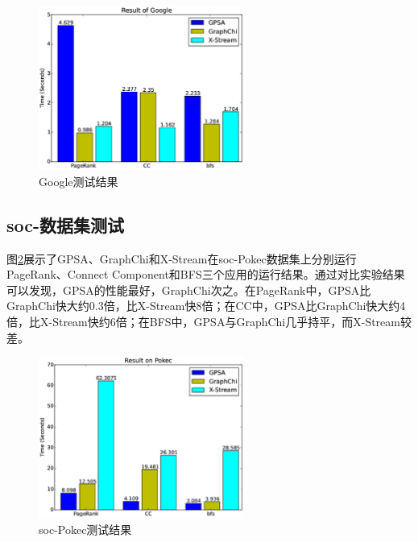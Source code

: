 \begin{figure}[htbp]
\centering
\includegraphics[width=0.6\textwidth,scale=0.8]{myfigures/googletime2.eps}
\caption{Google测试结果}
\label{res:google}
\end{figure}



\subsection{soc-数据集测试}
图\ref{res:pokec}展示了GPSA、GraphChi和X-Stream在soc-Pokec数据集上分别运行PageRank、Connect Component和BFS三个应用的运行结果。通过对比实验结果可以发现，GPSA的性能最好，GraphChi次之。在PageRank中，GPSA比GraphChi快大约0.3倍，比X-Stream快8倍；在CC中，GPSA比GraphChi快大约4倍，比X-Stream快约6倍；在BFS中，GPSA与GraphChi几乎持平，而X-Stream较差。

\begin{figure}[htbp]
\centering
\includegraphics[width=0.6\textwidth,scale=0.8]{myfigures/pokectime2.eps}
\caption{soc-Pokec测试结果}
\label{res:pokec}
\end{figure}


